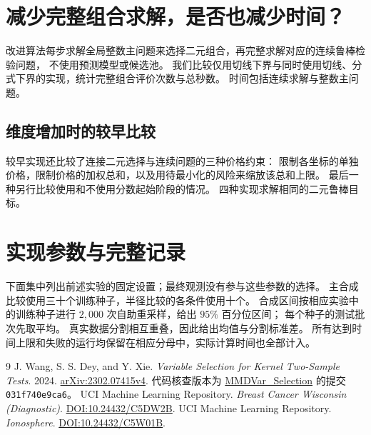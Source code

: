 \documentclass[11pt,a4paper]{article}
\begin{document}
\FloatBarrier
\section{减少完整组合求解，是否也减少时间？}\label{sec:search}
改进算法每步求解全局整数主问题来选择二元组合，再完整求解对应的连续鲁棒检验问题，
不使用预测模型或候选池。
我们比较仅用切线下界与同时使用切线、分式下界的实现，统计完整组合评价次数与总秒数。
时间包括连续求解与整数主问题。

\subsection{维度增加时的较早比较}\label{sec:compute}
较早实现还比较了连接二元选择与连续问题的三种价格约束：
限制各坐标的单独价格，限制价格的加权总和，以及用待最小化的风险来缩放该总和上限。
最后一种另行比较使用和不使用分数起始阶段的情况。
四种实现求解相同的二元鲁棒目标。

\FloatBarrier
\section{实现参数与完整记录}\label{sec:parameters}
下面集中列出前述实验的固定设置；最终观测没有参与这些参数的选择。
主合成比较使用三十个训练种子，半径比较的各条件使用十个。
合成区间按相应实验中的训练种子进行 $2{,}000$ 次自助重采样，给出 $95\%$ 百分位区间；
每个种子的测试批次先取平均。
真实数据分割相互重叠，因此给出均值与分割标准差。
所有达到时间上限和失败的运行均保留在相应分母中，实际计算时间也全部计入。

\begin{thebibliography}{9}
 J. Wang, S. S. Dey, and Y. Xie.
\emph{Variable Selection for Kernel Two-Sample Tests}. 2024.
\href{https://arxiv.org/abs/2302.07415}{arXiv:2302.07415v4}.
代码核查版本为
\href{https://github.com/WalterBabyRudin/MMDVar_Selection}{MMDVar\_Selection}
的提交 \texttt{031f740e9ca6}。
 UCI Machine Learning Repository.
\emph{Breast Cancer Wisconsin (Diagnostic)}. \href{https://doi.org/10.24432/C5DW2B}{DOI:10.24432/C5DW2B}.
 UCI Machine Learning Repository.
\emph{Ionosphere}. \href{https://doi.org/10.24432/C5W01B}{DOI:10.24432/C5W01B}.
\end{thebibliography}
\end{document}
